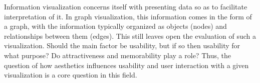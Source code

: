\documentclass[12pt, twocolumn]{article}
\begin{document}
Information visualization concerns itself with presenting data so as to facilitate interpretation of it. 
In graph visualization, this information comes in the form of a graph, with the information typically organized as objects (nodes) and relationships between them (edges).
This still leaves open the evaluation of such a visualization. 
Should the main factor be usability, but if so then usability for what purpose?
Do attractiveness and memorability play a role?
Thus, the question of how aesthetics influences usability and user interaction with a given visualization is a core question in this field. 
\\
\end{document}
